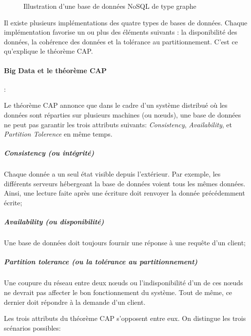	
	\begin{figure}[H]
		\centering
		\resizebox{\textwidth}{!}{
		
	    }
		\caption{Illustration d'une base de données NoSQL de type graphe}
		\label{fig:graphe-nosql}
	\end{figure}
	
	Il existe plusieurs implémentations des quatre types de bases de données. Chaque implémentation favorise un ou plus des éléments suivants : la disponibilité des données, la cohérence des données et la tolérance au partitionnement.  C'est ce qu'explique le théorème CAP.	
		
		\paragraph{Big Data et le théorème  CAP} \label{par:cap-theorem}:
		
		Le théorème CAP annonce que dans le cadre d'un système distribué où les données sont réparties sur plusieurs machines (ou n\oe{}uds),
		une base de données ne peut pas garantir les trois attributs suivants: \textit{Consistency}, \textit{Availability}, et \textit{Partition Tolerence}  en même temps. 
		
		
			\subparagraph{ Consistency (ou intégrité)} Chaque donnée a un seul état visible depuis l'extérieur. Par exemple, les différents serveurs hébergeant la base de données voient tous les mêmes données. Ainsi, une lecture faite après une écriture doit renvoyer la donnée précédemment écrite;
			
			\subparagraph{ Availability (ou disponibilité)} Une base de données doit toujours fournir une réponse à une requête d'un client; 
			
			
			 \subparagraph{Partition tolerance (ou la tolérance au partitionnement) } Une coupure du réseau entre deux n\oe{}uds ou l'indisponibilité d'un de ces n\oe{}uds ne devrait pas affecter le bon fonctionnement du système. Tout de même,  ce dernier doit répondre à la demande d'un client. 

		
		Les trois attributs du théorème CAP s'opposent entre eux. On distingue les trois scénarios possibles:
		
